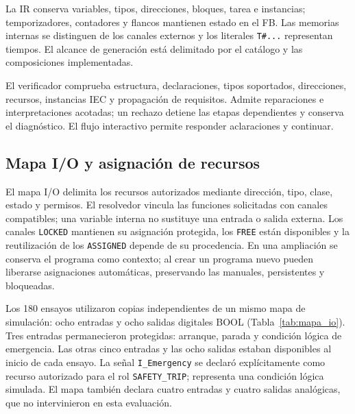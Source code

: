 \documentclass[a4paper,fleqn]{cas-dc}
\begin{document}
La IR conserva variables, tipos, direcciones, bloques, tarea e instancias; temporizadores, contadores y flancos mantienen estado en el FB. Las memorias internas se distinguen de los canales externos y los literales \texttt{T\#...} representan tiempos. El alcance de generación está delimitado por el catálogo y las composiciones implementadas.

\label{sec:verificacion}
El verificador comprueba estructura, declaraciones, tipos soportados, direcciones, recursos, instancias IEC y propagación de requisitos. Admite reparaciones e interpretaciones acotadas; un rechazo detiene las etapas dependientes y conserva el diagnóstico. El flujo interactivo permite responder aclaraciones y continuar.

\subsection{Mapa I/O y asignación de recursos}
\label{sec:mapa_io}
El mapa I/O delimita los recursos autorizados mediante dirección, tipo, clase, estado y permisos. El resolvedor vincula las funciones solicitadas con canales compatibles; una variable interna no sustituye una entrada o salida externa. Los canales \texttt{LOCKED} mantienen su asignación protegida, los \texttt{FREE} están disponibles y la reutilización de los \texttt{ASSIGNED} depende de su procedencia. En una ampliación se conserva el programa como contexto; al crear un programa nuevo pueden liberarse asignaciones automáticas, preservando las manuales, persistentes y bloqueadas.

Los 180 ensayos utilizaron copias independientes de un mismo mapa de simulación: ocho entradas y ocho salidas digitales BOOL (Tabla~\ref{tab:mapa_io}). Tres entradas permanecieron protegidas: arranque, parada y condición lógica de emergencia. Las otras cinco entradas y las ocho salidas estaban disponibles al inicio de cada ensayo. La señal \texttt{I\_Emergency} se declaró explícitamente como recurso autorizado para el rol \texttt{SAFETY\_TRIP}; representa una condición lógica simulada. El mapa también declara cuatro entradas y cuatro salidas analógicas, que no intervinieron en esta evaluación.
\end{document}
